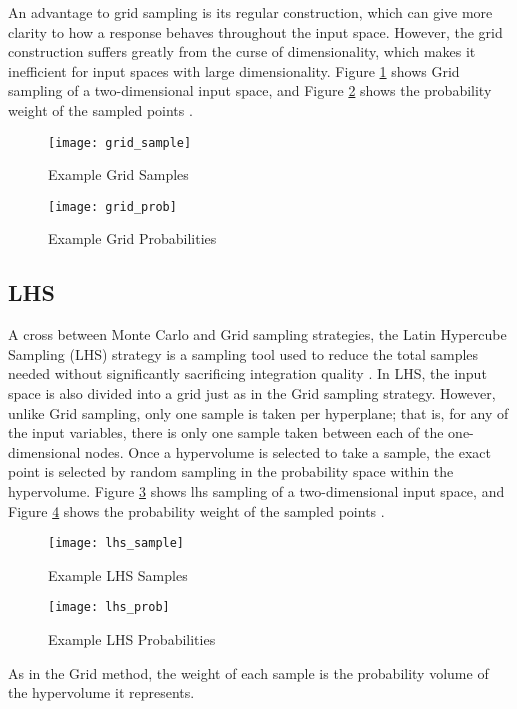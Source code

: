 An advantage to grid sampling is its regular construction, which can give more clarity to how a response
behaves throughout the input space.  However, the grid construction suffers greatly from the curse of
dimensionality, which makes it inefficient for input spaces with large dimensionality.
Figure \ref{fig:grid sample}
shows Grid sampling of a two-dimensional input space, and Figure \ref{fig:grid prob} shows the
probability weight of the sampled points \cite{raven}.

\begin{figure}[H]
  \centering
  \texttt{[image: grid\_sample]}
  \caption{Example Grid Samples \cite{raven}}
  \label{fig:grid sample}
\end{figure}
\begin{figure}[H]
  \centering
  \texttt{[image: grid\_prob]}
  \caption{Example Grid Probabilities \cite{raven}}
  \label{fig:grid prob}
\end{figure}


\subsection{LHS}
A cross between Monte Carlo and Grid sampling strategies, the Latin Hypercube Sampling (LHS) strategy 
is a sampling tool used to reduce
the total samples needed without significantly sacrificing integration quality \cite{lhs}.  In LHS, the input
space is also divided into a grid just as in the Grid sampling strategy.  However, unlike Grid sampling, only
one sample is taken per hyperplane; that is, for any of the input variables, there is only one sample taken
between each of the one-dimensional nodes.  Once a hypervolume is selected to take a sample, the exact
point is selected by random sampling in the probability space within the hypervolume.
Figure \ref{fig:lhs sample}
shows lhs sampling of a two-dimensional input space, and Figure \ref{fig:lhs prob} shows the
probability weight of the sampled points \cite{raven}.

\begin{figure}[H]
  \centering
  \texttt{[image: lhs\_sample]}
  \caption{Example LHS Samples \cite{raven}}
  \label{fig:lhs sample}
\end{figure}
\begin{figure}[H]
  \centering
  \texttt{[image: lhs\_prob]}
  \caption{Example LHS Probabilities \cite{raven}}
  \label{fig:lhs prob}
\end{figure}

As in the Grid method, the weight of each sample is the probability volume of the hypervolume it represents.

